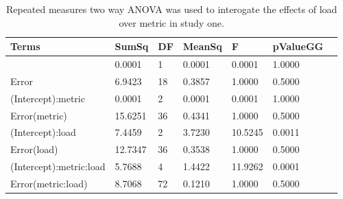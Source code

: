 \begin{table}
\centering
\begin{tabular}[0.2em]{@{}lllllll@{}}\toprule
Terms & SumSq & DF & MeanSq & F & pValueGG\\\toprule[0.2em]
(Intercept) & 0.0001 & 1 & 0.0001 & 0.0001 & 1.0000 \\\midrule
Error & 6.9423 & 18 & 0.3857 & 1.0000 & 0.5000 \\\midrule
(Intercept):metric & 0.0001 & 2 & 0.0001 & 0.0001 & 1.0000 \\\midrule
Error(metric) & 15.6251 & 36 & 0.4341 & 1.0000 & 0.5000 \\\midrule
(Intercept):load & 7.4459 & 2 & 3.7230 & 10.5245 & 0.0011 \\\midrule
Error(load) & 12.7347 & 36 & 0.3538 & 1.0000 & 0.5000 \\\midrule
(Intercept):metric:load & 5.7688 & 4 & 1.4422 & 11.9262 & 0.0001 \\\midrule
Error(metric:load) & 8.7068 & 72 & 0.1210 & 1.0000 & 0.5000 \\\bottomrule[0.2em]
\end{tabular}
\caption{Repeated measures two way ANOVA was used to interogate the effects of load over metric in study one.\label{tabel:tbl_RMABA1}}
\end{table}
